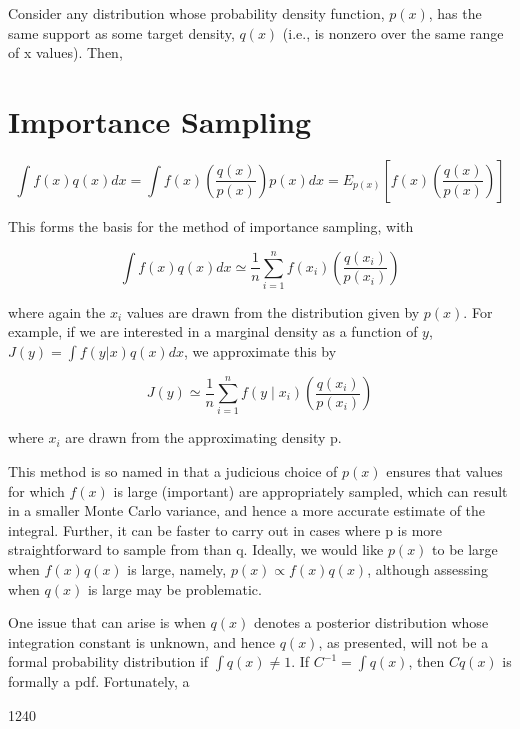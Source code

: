 \documentclass{article}
\begin{document}
Consider any distribution whose probability density function,  $ p(x) $, has the same support as some target density,  $ q(x) $ (i.e., is nonzero over the same range of x values). Then,

\section{Importance Sampling}
\begin{equation}
\int f(x)q(x)dx=\int f(x)\left(\frac{q(x)}{p(x)}\right)p(x)dx=E_{p(x)}\left[f(x)\left(\frac{q(x)}{p(x)}\right)\right]
\end{equation}

This forms the basis for the method of importance sampling, with

\begin{equation}
\int f(x)q(x)dx\simeq\frac{1}{n}\sum_{i=1}^{n}f(x_{i})\left(\frac{q(x_{i})}{p(x_{i})}\right)
\end{equation}

where again the  $ x_i $ values are drawn from the distribution given by  $ p(x) $. For example, if we are interested in a marginal density as a function of  $ y $,  $ J(y) = \int f(y | x) q(x) dx $, we approximate this by

\begin{equation}
J(y)\simeq\frac{1}{n}\sum_{i=1}^{n}f(y\mid x_{i})\left(\frac{q(x_{i})}{p(x_{i})}\right)
\end{equation}

where  $ x_{i} $ are drawn from the approximating density p.

This method is so named in that a judicious choice of  $ p(x) $ ensures that values for which  $ f(x) $ is large (important) are appropriately sampled, which can result in a smaller Monte Carlo variance, and hence a more accurate estimate of the integral. Further, it can be faster to carry out in cases where p is more straightforward to sample from than q. Ideally, we would like  $ p(x) $ to be large when  $ f(x)q(x) $ is large, namely,  $ p(x) \propto f(x)q(x) $, although assessing when  $ q(x) $ is large may be problematic.

One issue that can arise is when  $ q(x) $ denotes a posterior distribution whose integration constant is unknown, and hence  $ q(x) $, as presented, will not be a formal probability distribution if  $ \int q(x) \neq 1 $. If  $ C^{-1} = \int q(x) $, then  $ Cq(x) $ is formally a pdf. Fortunately, a

1240
\end{document}
